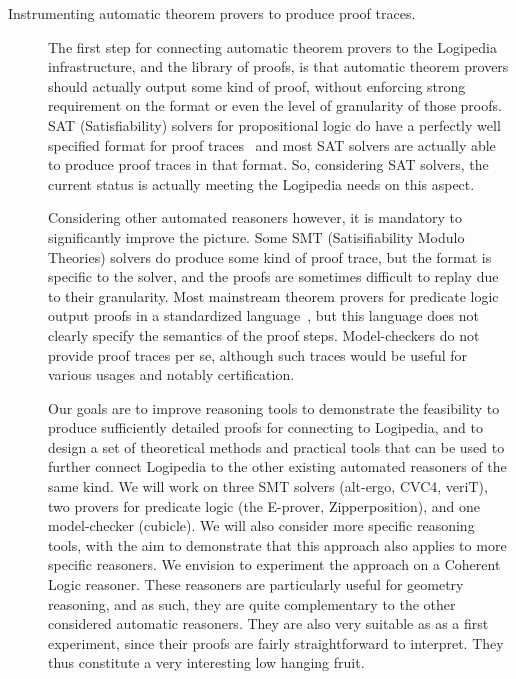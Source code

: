 \begin{description}
\item[Instrumenting automatic theorem provers to produce proof traces.] The first step for connecting automatic theorem provers to the Logipedia infrastructure, and the library of proofs, is that automatic theorem provers should actually output some kind of proof, without enforcing strong requirement on the format or even the level of granularity of those proofs.  SAT (Satisfiability) solvers for propositional logic do have a perfectly well specified format for proof traces~\cite{TODO} and most SAT solvers are actually able to produce proof traces in that format.  So, considering SAT solvers, the current status is actually meeting the Logipedia needs on this aspect.

  Considering other automated reasoners however, it is mandatory to
  significantly improve the picture.  Some SMT (Satisifiability Modulo
  Theories) solvers do produce some kind of proof trace, but the
  format is specific to the solver, and the proofs are sometimes
  difficult to replay due to their granularity.  Most mainstream
  theorem provers for predicate logic output proofs in a standardized
  language~\cite{TODO}, but this language does not clearly specify the
  semantics of the proof steps.  Model-checkers do not provide proof
  traces per se, although such traces would be useful for various
  usages and notably certification.

  Our goals are to improve reasoning tools to demonstrate the
  feasibility to produce sufficiently detailed proofs for connecting
  to Logipedia, and to design a set of theoretical methods and
  practical tools that can be used to further connect Logipedia to the
  other existing automated reasoners of the same kind.  We will work
  on three SMT solvers (alt-ergo, CVC4, veriT), two provers for
  predicate logic (the E-prover, Zipperposition), and one
  model-checker (cubicle).  We will also consider more specific
  reasoning tools, with the aim to demonstrate that this approach also
  applies to more specific reasoners.  We envision to experiment the
  approach on a Coherent Logic reasoner.  These reasoners are
  particularly useful for geometry reasoning, and as such, they are
  quite complementary to the other considered automatic reasoners.
  They are also very suitable as as a first experiment, since their
  proofs are fairly straightforward to interpret.  They thus
  constitute a very interesting low hanging fruit.
  

\end{description}
